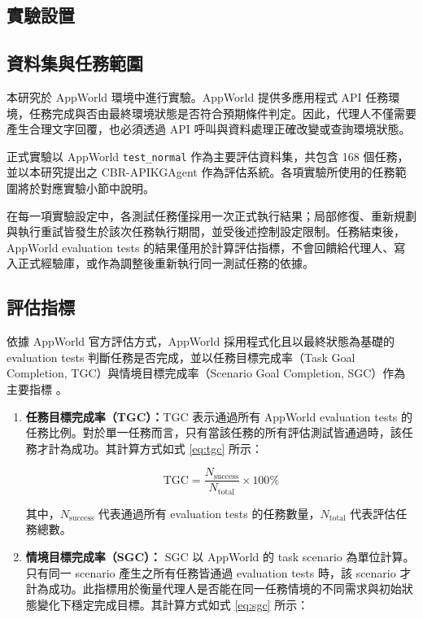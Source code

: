 \begin{ZhChapter}
\section{實驗設置}

\subsection{資料集與任務範圍}

本研究於 AppWorld \cite{trivedi2024appworld} 環境中進行實驗。AppWorld 提供多應用程式 API 任務環境，任務完成與否由最終環境狀態是否符合預期條件判定。因此，代理人不僅需要產生合理文字回覆，也必須透過 API 呼叫與資料處理正確改變或查詢環境狀態。

正式實驗以 AppWorld \texttt{test\_normal} 作為主要評估資料集，共包含 168 個任務，並以本研究提出之 CBR-APIKGAgent 作為評估系統。各項實驗所使用的任務範圍將於對應實驗小節中說明。

在每一項實驗設定中，各測試任務僅採用一次正式執行結果；局部修復、重新規劃與執行重試皆發生於該次任務執行期間，並受後述控制設定限制。任務結束後，AppWorld evaluation tests 的結果僅用於計算評估指標，不會回饋給代理人、寫入正式經驗庫，或作為調整後重新執行同一測試任務的依據。

\subsection{評估指標}

依據 AppWorld 官方評估方式，AppWorld 採用程式化且以最終狀態為基礎的 evaluation tests 判斷任務是否完成，並以任務目標完成率（Task Goal Completion, TGC）與情境目標完成率（Scenario Goal Completion, SGC）作為主要指標 \cite{trivedi2024appworld}。

\begin{enumerate}
    \item \textbf{任務目標完成率（TGC）：}TGC 表示通過所有 AppWorld evaluation tests 的任務比例。對於單一任務而言，只有當該任務的所有評估測試皆通過時，該任務才計為成功。其計算方式如式 \ref{eq:tgc} 所示：

    \begin{equation}
        \mathrm{TGC} = \frac{N_{\mathrm{success}}}{N_{\mathrm{total}}} \times 100\%
        \label{eq:tgc}
    \end{equation}

    其中，\(N_{\mathrm{success}}\) 代表通過所有 evaluation tests 的任務數量，\(N_{\mathrm{total}}\) 代表評估任務總數。

    \item \textbf{情境目標完成率（SGC）：}
    SGC 以 AppWorld 的 task scenario 為單位計算。只有同一 scenario 產生之所有任務皆通過 evaluation tests 時，該 scenario 才計為成功。此指標用於衡量代理人是否能在同一任務情境的不同需求與初始狀態變化下穩定完成目標。其計算方式如式 \ref{eq:sgc} 所示：


\end{enumerate}
\end{ZhChapter}
